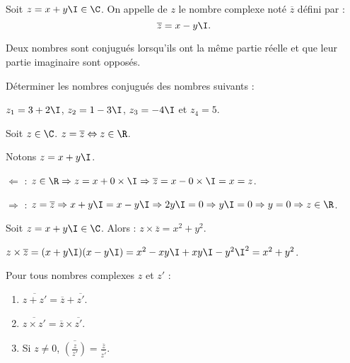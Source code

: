 \documentclass[10pt,openright,twoside,french]{book}
\begin{document}
\begin{Defi}
    Soit $z = x + y\I \in \C$. On appelle  de $z$ le nombre complexe noté $\overline z$ défini par :
    \[\overline z = x - y\I.\]
\end{Defi}

\begin{Rmq}
    Deux nombres sont conjugués lorsqu'ils ont la même partie réelle et que leur partie imaginaire sont opposés.
\end{Rmq}

\begin{Exemple}[s]
    Déterminer les nombres conjugués des nombres suivants :\par $z_1 = 3 + 2\I$, $z_2 = 1 - 3\I$, $z_3 = -4\I$ et $z_4 = 5$.
\end{Exemple}

\begin{Prop}
    Soit $z \in \C$. $z = \overline z \Leftrightarrow z \in \R$.
\end{Prop}

\begin{Demo}
    Notons $z = x + y\I$.\par
    $\Leftarrow$ : $z \in \R \Rightarrow z = x + 0 \times \I \Rightarrow \overline z = x - 0 \times \I = x = z$.\par\medskip
    $\Rightarrow$ : $z = \overline z \Rightarrow x + y\I = x - y\I \Rightarrow 2y\I = 0 \Rightarrow y\I = 0 \Rightarrow y = 0 \Rightarrow z \in \R$.
\end{Demo}

\begin{Prop}
    Soit $z = x + y\I \in \C$. Alors : $z \times \overline z = x^2 + y^2$.
\end{Prop}

\begin{Demo}
    $z \times \overline z = (x + y\I)(x - y\I) = x^2 - xy\I + xy\I -y^2\I^2 = x^2 + y^2$.
\end{Demo}

\begin{Prop}
    Pour tous nombres complexes $z$ et $z'$ :
    \begin{enumerate}
        \item $\overline{z + z'} = \overline z + \overline{z'}$.
        \item $\overline{z \times z'} = \overline z \times \overline{z'}$.
        \item Si $z \neq 0$, $\overline{\left(\frac{z}{z'}\right)} = \frac{\overline z}{\overline{z'}}$.
    \end{enumerate}
\end{Prop}
\end{document}
